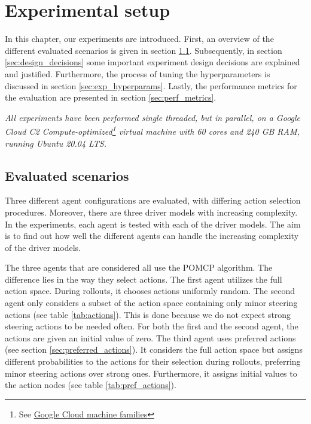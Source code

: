 \chapter{Experimental setup}
\label{ch:setup}



In this chapter, our experiments are introduced. First, an overview of the different evaluated scenarios is given in section \ref{sec:scenarios}. Subsequently, in section \ref{sec:design_decisions} some important experiment design decisions are explained and justified. Furthermore, the process of tuning the hyperparameters is discussed in section \ref{sec:exp_hyperparams}. Lastly, the performance metrics for the evaluation are presented in section \ref{sec:perf_metrics}.

\emph{All experiments have been performed single threaded, but in parallel, on a Google Cloud C2 Compute-optimized\footnote{See \href{https://cloud.google.com/compute/docs/machine-types}{Google Cloud machine families}} virtual machine with 60 cores and 240 GB RAM, running Ubuntu 20.04 LTS.}



\section{Evaluated scenarios}
\label{sec:scenarios}

Three different agent configurations are evaluated, with differing action selection procedures. Moreover, there are three driver models with increasing complexity. In the experiments, each agent is tested with each of the driver models. The aim is to find out how well the different agents can handle the increasing complexity of the driver models.

The three agents that are considered all use the POMCP algorithm. The difference lies in the way they select actions. The first agent utilizes the full action space. During rollouts, it chooses actions uniformly random. The second agent only considers a subset of the action space containing only minor steering actions (see table \ref{tab:actions}). This is done because we do not expect strong steering actions to be needed often. For both the first and the second agent, the actions are given an initial value of zero. The third agent uses preferred actions (see section \ref{sec:preferred_actions}). It considers the full action space but assigns different probabilities to the actions for their selection during rollouts, preferring minor steering actions over strong ones. Furthermore, it assigns initial values to the action nodes (see table \ref{tab:pref_actions}).

